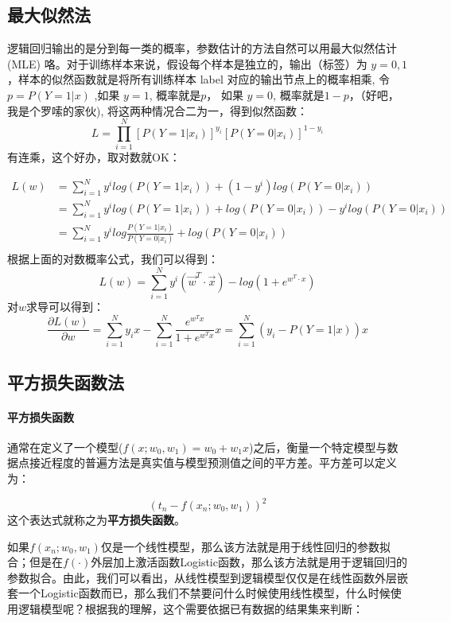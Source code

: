 \documentclass[a4paper, 11pt, UTF8]{ctexart} %
\begin{document}
\subsection{最大似然法}

逻辑回归输出的是分到每一类的概率，参数估计的方法自然可以用最大似然估计 (MLE) 咯。对于训练样本来说，假设每个样本是独立的，输出（标签）为 $y = {0, 1}$，样本的似然函数就是将所有训练样本 label 对应的输出节点上的概率相乘, 令 $p = P(Y=1|x)$ ,如果 $y = 1$, 概率就是$ p$， 如果 $y = 0$, 概率就是$ 1 - p $，（好吧，我是个罗嗦的家伙),  将这两种情况合二为一，得到似然函数：
$$ L=\prod_{i=1}^{N}{[P(Y=1|x_i)]^{y_i} [P(Y=0|x_i)]^{1-y_i}} $$
有连乘，这个好办，取对数就OK：

\begin{align*}
 L(w) &= \sum _{i=1} ^{N} {y^i log(P(Y=1|x_i)) + (1-y^i)log(P(Y=0|x_i))} \\
      &= \sum _{i=1} ^{N} {y^i log(P(Y=1|x_i)) + log(P(Y=0|x_i)) - y^ilog(P(Y=0|x_i))} \\
      &= \sum _{i=1} ^{N} {y^i log\frac{P(Y=1|x_i)} {P(Y=0|x_i)} + log(P(Y=0|x_i))} \\
\end{align*}
根据上面的对数概率公式，我们可以得到：
$$ L(w) = \sum _{i=1} ^{N} {y^i (\vec w^T \cdot \vec x ) - log(1 + e^{w^T \cdot x})}$$
对$w$求导可以得到：
$$ \frac {\partial L(w)}{\partial w} = \sum _{i=1} ^{N} {y_ix} - \sum_{i=1}^{N}{\frac{e^{w^Tx}}{1+e^{w^Tx}}x} = \sum _{i=1} ^{N} {(y_i - P(Y=1|x))x}$$

\subsection{平方损失函数法}

\paragraph{平方损失函数}通常在定义了一个模型($f(x;w_0,w_1)=w_0+w_1x$)之后，衡量一个特定模型与数据点接近程度的普遍方法是真实值与模型预测值之间的平方差。平方差可以定义为：

$$ {(t_n - f( x_n; w_0, w_1 ))}^2 $$
这个表达式就称之为\textbf{平方损失函数}。

如果$ f(x_n; w_0, w_1) $仅是一个线性模型，那么该方法就是用于线性回归的参数拟合；但是在$ f(\cdot) $外层加上激活函数Logistic函数，那么该方法就是用于逻辑回归的参数拟合。由此，我们可以看出，从线性模型到逻辑模型仅仅是在线性函数外层嵌套一个Logistic函数而已，那么我们不禁要问什么时候使用线性模型，什么时候使用逻辑模型呢？根据我的理解，这个需要依据已有数据的结果集来判断：
\end{document}
